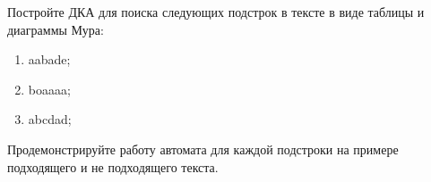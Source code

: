 \question 
Постройте ДКА для поиска следующих подстрок в тексте в виде таблицы и диаграммы Мура:
\begin{enumerate}
\item  aabade;
\item  boaaaa;
\item  abcdad;
\end{enumerate}
Продемонстрируйте работу автомата для каждой подстроки на примере подходящего и не подходящего текста.
